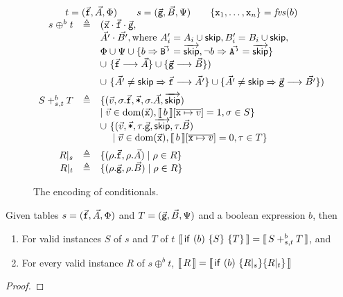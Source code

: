 \begin{figure}[tpb]
  \[\begin{array}{rcl}
      \multicolumn 3 c {t = (\vec{\var f}, \vec A, \Phi) \qquad s = (\vec{\var g}, \vec B, \Psi) \qquad \{\var x_1, \ldots, \var x_n\} = \fvs(b)}\\
      s \mathrel{\oplus^b} t
      & \triangleq
      & (\vec{\var x}\cdot\vec{\var f}\cdot \vec{\var g},\\
      && \vec{A'}\cdot\vec{B'}, \text{where}~ A'_i = A_i \cup \SKIP, B'_i = B_i \cup\SKIP, \\
      && \Phi \cup \Psi \cup \{b \Rightarrow \vec{\var{B'}} = \overrightarrow \SKIP, \neg b \Rightarrow \vec {\var{A'}} = \overrightarrow\SKIP\}\\
      && \cup~\{\vec{\var f} \longrightarrow \vec A\} \cup
         \{\vec{\var g} \longrightarrow \vec B\}
         )\\[.5em]
      && \cup~\{\vec{A'} \neq \SKIP \Rightarrow  \vec{\var f} \longrightarrow \vec{A'}\} \cup   \{\vec{A'} \neq \SKIP \Rightarrow \vec{\var g} \longrightarrow \vec{B'}\}
         )\\[.5em]
      S +^b_{s,t} T
      & \triangleq
      & \{(\vec v, \sigma.\vec{\var{f}}, \vec{\var *}, \sigma.\vec A, \overrightarrow{\SKIP})\\
      &&\mid \vec v \in \dom(\vec{\var x}), \bracbb{b}[\overline{\var x \mapsto v}] = \TRUE, \sigma \in S \} \\
      && \cup~\{(\vec v, \vec{\var *}, \tau.\vec{\var{g}}, \overrightarrow{\SKIP}, \tau.\vec B) \\
      && \phantom{\cup}~\mid \vec v \in \dom(\vec{\var x}), \bracbb{b}[\overline{\var x \mapsto v}] = \FALSE, \tau \in T \}\\[.5em]
      R|_s
      &\triangleq
      & \{(\rho.\vec{\var f},\rho.{\vec A}) \mid  \rho \in R\}\\
      R|_t
      & \triangleq
      & \{(\rho.\vec{\var g}, \rho.\vec B) \mid \rho \in R\}
    \end{array}
  \]
  \caption{The encoding of conditionals. }
  \label{fig:conditionals}
\end{figure}

\begin{theorem}
  Given tables $s = (\vec{\texttt{f}}, \vec A, \Phi)$ and
  $T = (\vec{\texttt{g}}, \vec B, \Psi)$ and a boolean expression $b$,
  then
  \begin{enumerate}
  \item For valid instances $S$ of $s$ and $T$ of $t$
    $\llbracket\,\mathsf{if}~(b)~\{S\}~\{T\}\,\rrbracket = \llbracket\,S +_{s,t}^b T\,\rrbracket$, and
  \item For every valid instance $R$ of $s \oplus^b t$,
    $\llbracket\,R\,\rrbracket = \llbracket\,\mathsf{if}~(b)~\{R|_s\} \{R|_t\}\,\rrbracket$
  \end{enumerate}
\end{theorem}
\begin{proof}
\end{proof}



